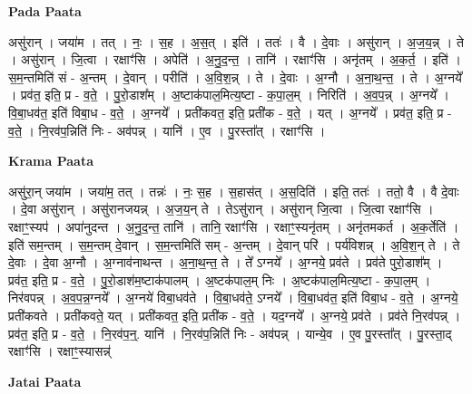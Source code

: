 \documentclass[17pt]{extarticle}
\begin{document}
\textbf{Pada Paata} \newline

असु॑रान् । जया॑म । तत् । नः॒ । स॒ह । अ॒स॒त् । इति॑ । ततः॑ । वै । दे॒वाः । असु॑रान् । अ॒ज॒य॒न्न् । ते । असु॑रान् । जि॒त्वा । रक्षाꣳ॑सि । अपेति॑ । अ॒नु॒द॒न्त॒ । तानि॑ । रक्षाꣳ॑सि । अनृ॑तम् । अ॒क॒र्त॒ । इति॑ । स॒म॒न्तमिति॑ सं - अ॒न्तम् । दे॒वान् । परीति॑ । अ॒वि॒श॒न्न् । ते । दे॒वाः । अ॒ग्नौ । अ॒ना॒थ॒न्त॒ । ते । अ॒ग्नये᳚ । प्रव॑त॒ इति॒ प्र - व॒ते॒ । पु॒रो॒डाश᳚म् । अ॒ष्टाक॑पाल॒मित्य॒ष्टा - क॒पा॒ल॒म् । निरिति॑ । अ॒व॒प॒न्न् । अ॒ग्नये᳚ । वि॒बा॒धव॑त॒ इति॑ विबा॒ध - व॒ते॒ । अ॒ग्नये᳚ । प्रती॑कवत॒ इति॒ प्रती॑क - व॒ते॒ । यत् । अ॒ग्नये᳚ । प्रव॑त॒ इति॒ प्र - व॒ते॒ । नि॒रव॑प॒न्निति॑ निः - अव॑पन्न् । यानि॑ । ए॒व । पु॒रस्ता᳚त् । रक्षाꣳ॑सि ।  \newline


\textbf{Krama Paata} \newline

असु॑रा॒न् जया॑म । जया॑म॒ तत् । तन्नः॑ । नः॒ स॒ह । स॒हास॑त् । अ॒स॒दिति॑ । इति॒ ततः॑ । ततो॒ वै । वै दे॒वाः । दे॒वा असु॑रान् । असु॑रानजयन्न् । अ॒ज॒य॒न् ते । तेऽसु॑रान् । असु॑रान् जि॒त्वा । जि॒त्वा रक्षाꣳ॑सि । रक्षाꣳ॒॒स्यप॑ । अपा॑नुदन्त । अ॒नु॒द॒न्त॒ तानि॑ । तानि॒ रक्षाꣳ॑सि । रक्षाꣳ॒॒स्यनृ॑तम् । अनृ॑तमकर्त । अ॒क॒र्तेति॑ । इति॑ सम॒न्तम् । स॒म॒न्तम् दे॒वान् । स॒म॒न्तमिति॑ सम् - अ॒न्तम् । दे॒वान् परि॑ । पर्य॑विशन्न् । अ॒वि॒श॒न् ते । ते दे॒वाः । दे॒वा अ॒ग्नौ । अ॒ग्नाव॑नाथन्त । अ॒ना॒थ॒न्त॒ ते । ते᳚ ऽग्नये᳚ । अ॒ग्नये॒ प्रव॑ते । प्रव॑ते पुरो॒डाश᳚म् । प्रव॑त॒ इति॒ प्र - व॒ते॒ । पु॒रो॒डाश॑म॒ष्टाक॑पालम् । अ॒ष्टक॑पाल॒म् निः । अ॒ष्टक॑पाल॒मित्य॒ष्टा - क॒पा॒ल॒म् । निर॑वपन्न् । अ॒व॒प॒न्न॒ग्नये᳚ । अ॒ग्नये॑ विबा॒धव॑ते । वि॒बा॒धव॑ते॒ ऽग्नये᳚ । वि॒बा॒धव॑त॒ इति॑ विबा॒ध - व॒ते॒ । अ॒ग्नये॒ प्रती॑कवते । प्रती॑कवते॒ यत् । प्रती॑कवत॒ इति॒ प्रती॑क - व॒ते॒ । यद॒ग्नये᳚ । अ॒ग्नये॒ प्रव॑ते । प्रव॑ते नि॒रव॑पन्न् । प्रव॑त॒ इति॒ प्र - व॒ते॒ । नि॒रव॑प॒न्॒. यानि॑ । नि॒रव॑प॒न्निति॑ निः - अव॑पन्न् । यान्ये॒व । ए॒व पु॒रस्ता᳚त् । पु॒रस्ता॒द् रक्षाꣳ॑सि । रक्षाꣳ॒॒स्यासन्न्॑ \newline

\textbf{Jatai Paata} \newline
\end{document}
